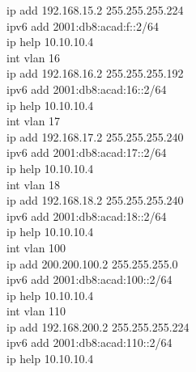 \documentclass[12pt,a4paper]{report}
\begin{document}
{\hspace*{2cm}ip add 192.168.15.2 255.255.255.224\\
\hspace*{2cm}ipv6 add 2001:db8:acad:f::2/64\\
\hspace*{2cm}ip help 10.10.10.4\\
\hspace*{2cm}int vlan 16\\
\hspace*{2cm}ip add 192.168.16.2 255.255.255.192\\
\hspace*{2cm}ipv6 add 2001:db8:acad:16::2/64 \\
\hspace*{2cm}ip help 10.10.10.4\\
\hspace*{2cm}int vlan 17\\
\hspace*{2cm}ip add 192.168.17.2 255.255.255.240\\
\hspace*{2cm}ipv6 add 2001:db8:acad:17::2/64 \\
\hspace*{2cm}ip help 10.10.10.4\\
\hspace*{2cm}int vlan 18\\
\hspace*{2cm}ip add 192.168.18.2 255.255.255.240\\
\hspace*{2cm}ipv6 add 2001:db8:acad:18::2/64 \\
\hspace*{2cm}ip help 10.10.10.4\\
\hspace*{2cm}int vlan 100\\
\hspace*{2cm}ip add 200.200.100.2 255.255.255.0 \\
\hspace*{2cm}ipv6 add 2001:db8:acad:100::2/64 \\
\hspace*{2cm}ip help 10.10.10.4\\
\hspace*{2cm}int vlan 110\\
\hspace*{2cm}ip add 192.168.200.2 255.255.255.224 \\
\hspace*{2cm}ipv6 add 2001:db8:acad:110::2/64 \\
\hspace*{2cm}ip help 10.10.10.4\\}
\end{document}
